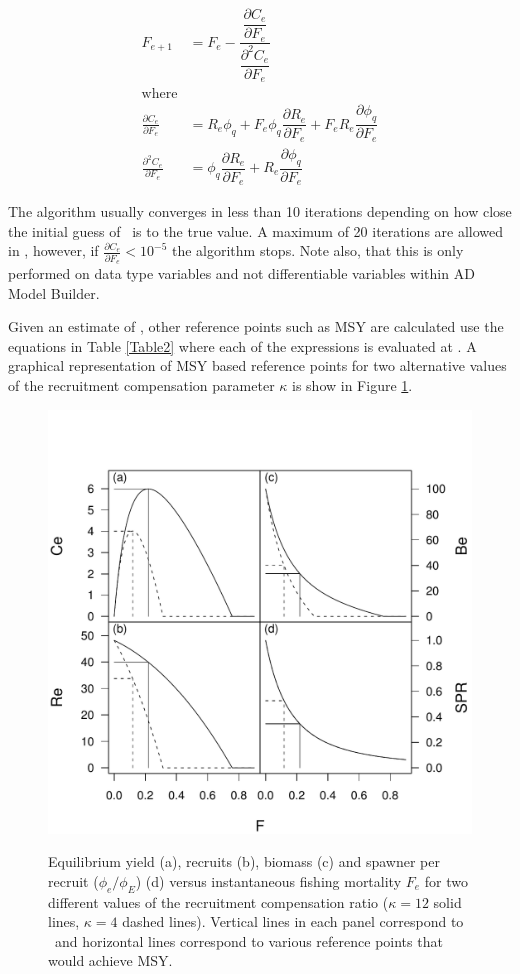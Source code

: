 \begin{align}\label{eq1.1}
    F_{e+1}&=F_e - 
    \dfrac{ \dfrac{\partial C_e}{\partial F_e}}
    { \dfrac{\partial^2 C_e}{\partial F_e}}\\
    \mbox{where}\nonumber\\
     \frac{\partial C_e}{\partial F_e} &=
    R_e \phi_q
    + F_e \phi_q \dfrac{\partial R_e}{\partial F_e}
    + F_e R_e \dfrac{\partial \phi_q}{\partial F_e} \nonumber\\
    \frac{\partial^2 C_e}{\partial F_e} &=
    \phi_q \dfrac{\partial R_e}{\partial F_e}
   +  R_e \dfrac{\partial \phi_q}{\partial F_e}\nonumber
\end{align}

The algorithm usually converges in less than 10 iterations depending on how close the initial guess of \fmsy\ is to the true value.  A maximum of 20 iterations are allowed in \iscam, however, if $\frac{\partial C_e}{\partial F_e}<10^{-5}$ the algorithm stops.  Note also, that this is only performed on data type variables and not differentiable variables within AD Model Builder.

Given an estimate of \fmsy, other reference points such as MSY are calculated use the equations in Table \ref{Table2} where each of the expressions is evaluated at \fmsy.  A graphical representation of MSY based reference points for two alternative values of the recruitment compensation parameter $\kappa$ is show in Figure \ref{FigMSY}.

\begin{figure}[!tbp]
  \centering
  \includegraphics[width=0.5\columnwidth]{../Figs/Fig1Quadplot.pdf}\\
  \caption{Equilibrium yield (a), recruits (b), biomass (c) and
spawner per recruit ($\phi_e/\phi_E$) (d) versus instantaneous
fishing mortality $F_e$ for two different values of the recruitment
compensation ratio ($\kappa=12$ solid lines, $\kappa=4$ dashed
lines). Vertical lines in each panel correspond to \fmsy\ and
horizontal lines correspond to various reference points that would
achieve MSY.}\label{FigMSY}
\end{figure}

